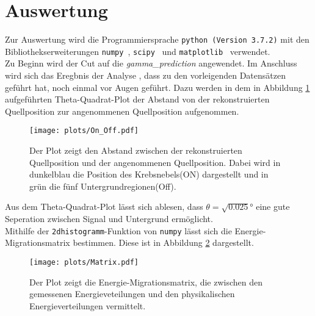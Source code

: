 \section{Auswertung}
Zur Auswertung wird die Programmiersprache \texttt{python (Version 3.7.2)} mit
den Bibliothekserweiterungen \texttt{numpy}~\cite{numpy}, \texttt{scipy}~\cite{scipy} und \texttt{matplotlib}~\cite{matplotlib} verwendet.\\
Zu Beginn wird der Cut auf die \textit{gamma\_prediction} angewendet. Im Anschluss wird sich das Eregbnis der Analyse \cite{FACTanalyse}, dass zu den vorleigenden Datensätzen geführt hat, noch einmal vor Augen geführt. Dazu werden in dem in Abbildung \ref{fig:Theta2} aufgeführten Theta-Quadrat-Plot der Abstand von der rekonstruierten Quellposition zur angenommenen Quellposition aufgenommen. \\
\begin{figure}
  \centering
  \texttt{[image: plots/On\_Off.pdf]}
  \caption{Der Plot zeigt den Abstand zwischen der rekonstruierten Quellposition und der angenommenen Quellposition. Dabei wird in dunkelblau die Position des Krebsnebels(ON) dargestellt und in grün die fünf Untergrundregionen(Off).}
  \label{fig:Theta2}
\end{figure}
Aus dem Theta-Quadrat-Plot lässt sich ablesen, dass $\theta = \sqrt{0.025}\si{\degree}$ eine gute Seperation zwischen Signal und Untergrund ermöglicht.\\
Mithilfe der \texttt{2dhistogramm}-Funktion von \texttt{numpy} lässt sich die Energie-Migrationsmatrix bestimmen. Diese ist in Abbildung \ref{fig:mig} dargestellt.\\
\begin{figure}
  \centering
  \texttt{[image: plots/Matrix.pdf]}
  \caption{Der Plot zeigt die Energie-Migrationsmatrix, die zwischen den gemessenen Energieveteilungen und den physikalischen Energieverteilungen vermittelt.}
  \label{fig:mig}
\end{figure}

